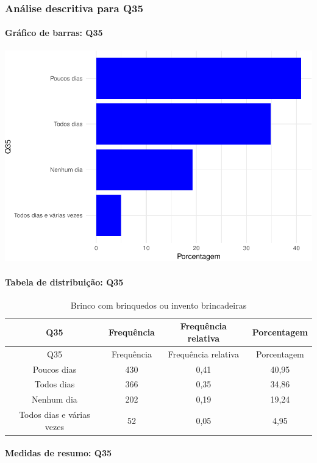 \documentclass[]{article}
\let\oldparagraph\paragraph
\renewcommand{\paragraph}[1]{\oldparagraph{#1}\mbox{}}
\begin{document}
\hypertarget{anuxe1lise-descritiva-para-q35}{%
\subsubsection{Análise descritiva para Q35}\label{anuxe1lise-descritiva-para-q35}}

\hypertarget{gruxe1fico-de-barras-q35}{%
\paragraph{Gráfico de barras: Q35}\label{gruxe1fico-de-barras-q35}}

\begin{center}\includegraphics[width=0.75\linewidth]{relatorio_covid19_files/figure-latex/unnamed-chunk-1248-1} \end{center}

\hypertarget{tabela-de-distribuiuxe7uxe3o-q35}{%
\paragraph{Tabela de distribuição: Q35}\label{tabela-de-distribuiuxe7uxe3o-q35}}

\begin{longtable}[]{@{}cccc@{}}
\caption{\label{tab:unnamed-chunk-1249}Brinco com brinquedos ou invento brincadeiras}\tabularnewline
\toprule
Q35 & Frequência & Frequência relativa & Porcentagem\tabularnewline
\midrule
\endfirsthead
\toprule
Q35 & Frequência & Frequência relativa & Porcentagem\tabularnewline
\midrule
\endhead
Poucos dias & 430 & 0,41 & 40,95\tabularnewline
Todos dias & 366 & 0,35 & 34,86\tabularnewline
Nenhum dia & 202 & 0,19 & 19,24\tabularnewline
Todos dias e várias vezes & 52 & 0,05 & 4,95\tabularnewline
\bottomrule
\end{longtable}

\hypertarget{medidas-de-resumo-q35}{%
\paragraph{Medidas de resumo: Q35}\label{medidas-de-resumo-q35}}
\end{document}
